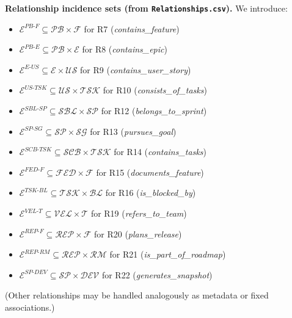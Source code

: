 \documentclass[11pt,a4paper]{article}
\begin{document}
\noindent\textbf{Relationship incidence sets (from \texttt{Relationships.csv}).} We introduce:
\begin{itemize}[leftmargin=*]
  \item $\mathcal{E}^{PB\text{-}F}\subseteq \mathcal{PB}\times\mathcal{F}$ for R7 (\emph{contains\_feature})
  \item $\mathcal{E}^{PB\text{-}E}\subseteq \mathcal{PB}\times\mathcal{E}$ for R8 (\emph{contains\_epic})
  \item $\mathcal{E}^{E\text{-}US}\subseteq \mathcal{E}\times\mathcal{US}$ for R9 (\emph{contains\_user\_story})
  \item $\mathcal{E}^{US\text{-}TSK}\subseteq \mathcal{US}\times\mathcal{TSK}$ for R10 (\emph{consists\_of\_tasks})
  \item $\mathcal{E}^{SBL\text{-}SP}\subseteq \mathcal{SBL}\times\mathcal{SP}$ for R12 (\emph{belongs\_to\_sprint})
  \item $\mathcal{E}^{SP\text{-}SG}\subseteq \mathcal{SP}\times\mathcal{SG}$ for R13 (\emph{pursues\_goal})
  \item $\mathcal{E}^{SCB\text{-}TSK}\subseteq \mathcal{SCB}\times\mathcal{TSK}$ for R14 (\emph{contains\_tasks})
  \item $\mathcal{E}^{FED\text{-}F}\subseteq \mathcal{FED}\times\mathcal{F}$ for R15 (\emph{documents\_feature})
  \item $\mathcal{E}^{TSK\text{-}BL}\subseteq \mathcal{TSK}\times\mathcal{BL}$ for R16 (\emph{is\_blocked\_by})
  \item $\mathcal{E}^{VEL\text{-}T}\subseteq \mathcal{VEL}\times\mathcal{T}$ for R19 (\emph{refers\_to\_team})
  \item $\mathcal{E}^{REP\text{-}F}\subseteq \mathcal{REP}\times\mathcal{F}$ for R20 (\emph{plans\_release})
  \item $\mathcal{E}^{REP\text{-}RM}\subseteq \mathcal{REP}\times\mathcal{RM}$ for R21 (\emph{is\_part\_of\_roadmap})
  \item $\mathcal{E}^{SP\text{-}DEV}\subseteq \mathcal{SP}\times\mathcal{DEV}$ for R22 (\emph{generates\_snapshot})
\end{itemize}
(Other relationships may be handled analogously as metadata or fixed associations.)
\end{document}
